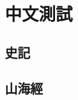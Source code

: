 
\chapter{中文測試}

\begin{tempsection}

\section{史記}

\zhlipsum[name=xiangyu]

\section{山海經}

\zhlipsum[name=nanshanjing]

\end{tempsection}